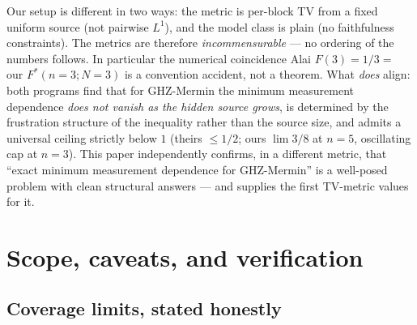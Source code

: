 \documentclass[aps,pra,reprint,superscriptaddress,floatfix]{revtex4-2}
\begin{document}
Our setup is different in two ways: the metric is per-block TV from a
fixed uniform source (not pairwise $L^{1}$), and the model class is plain
(no faithfulness constraints). The metrics are therefore
\emph{incommensurable} --- no ordering of the numbers follows. In
particular the numerical coincidence Alai $F(3)=1/3=$ our
$F^{*}(n=3;N=3)$ is a convention accident, not a theorem. What \emph{does}
align: both programs find that for GHZ-{Mermin} the minimum measurement
dependence \emph{does not vanish as the hidden source grows}, is determined
by the frustration structure of the inequality rather than the source
size, and admits a universal ceiling strictly below $1$ (theirs $\le 1/2$;
ours $\lim 3/8$ at $n=5$, oscillating cap at $n=3$). This paper
independently confirms, in a different metric, that ``exact minimum
measurement dependence for GHZ-{Mermin}'' is a well-posed problem with
clean structural answers --- and supplies the first TV-metric values for
it.

\section{Scope, caveats, and verification}
\label{sec:scope}

\subsection{Coverage limits, stated honestly}
\end{document}
